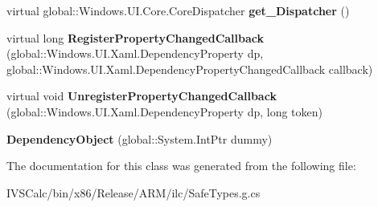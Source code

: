 \begin{DoxyCompactItemize}
\mbox{\label{class_windows_1_1_u_i_1_1_xaml_1_1_dependency_object_a508c7b4f0ff4fbffc03e3c15071bccad}} 
virtual global\+::\+Windows.\+U\+I.\+Core.\+Core\+Dispatcher {\bfseries get\+\_\+\+Dispatcher} ()
\item 
\mbox{\label{class_windows_1_1_u_i_1_1_xaml_1_1_dependency_object_ab58e52b043959b48f59e0631b15126f7}} 
virtual long {\bfseries Register\+Property\+Changed\+Callback} (global\+::\+Windows.\+U\+I.\+Xaml.\+Dependency\+Property dp, global\+::\+Windows.\+U\+I.\+Xaml.\+Dependency\+Property\+Changed\+Callback callback)
\item 
\mbox{\label{class_windows_1_1_u_i_1_1_xaml_1_1_dependency_object_a1038375289633f64b7f560eb26de036f}} 
virtual void {\bfseries Unregister\+Property\+Changed\+Callback} (global\+::\+Windows.\+U\+I.\+Xaml.\+Dependency\+Property dp, long token)
\item 
\mbox{\label{class_windows_1_1_u_i_1_1_xaml_1_1_dependency_object_a50ca400c3d5d8fb25c7f568083aab1b9}} 
{\bfseries Dependency\+Object} (global\+::\+System.\+Int\+Ptr dummy)
\end{DoxyCompactItemize}


The documentation for this class was generated from the following file\+:\begin{DoxyCompactItemize}
\item 
I\+V\+S\+Calc/bin/x86/\+Release/\+A\+R\+M/ilc/Safe\+Types.\+g.\+cs\end{DoxyCompactItemize}
